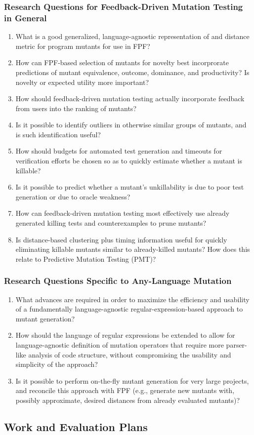 \subsubsection{Research Questions for Feedback-Driven Mutation Testing
in General}

\begin{enumerate}
\item What is a good generalized, language-agnostic representation
  of and distance metric for program mutants for use in FPF?
\item How can FPF-based selection of mutants for novelty best incorprorate
  predictions of mutant equivalence, outcome, dominance, and
  productivity?  Is novelty or expected utility more important?
\item How should feedback-driven mutation testing actually incorporate feedback from users into the 
  ranking of mutants? 
\item Is it possible to identify outliers in otherwise similar groups of
  mutants, and is such identification useful?
\item How should budgets for automated test generation and
  timeouts for verification efforts be chosen so as to quickly estimate whether a
  mutant is killable?
\item Is it possible to predict whether a mutant's unkillability is due to poor test 
  generation  or due to oracle weakness? 
\item How can feedback-driven mutation testing most effectively use already generated killing tests
  and counterexamples to prune mutants?
\item Is distance-based clustering plus timing information useful for quickly
  eliminating killable mutants similar to already-killed mutants?  How
  does this relate to Predictive Mutation Testing (PMT)?

\end{enumerate}

\subsubsection{Research Questions Specific to Any-Language Mutation}

\begin{enumerate}
\item What advances are required in order to maximize the efficiency and usability of a
  fundamentally language-agnostic regular-expression-based approach to
  mutant generation?
\item How should the language of regular expressions be extended to allow
  for language-agnostic definition of mutation operators that require
  more parser-like analysis of code structure, without compromising
  the usability and simplicity of the approach?
\item Is it possible to perform on-the-fly mutant generation for very
  large projects, and reconcile this approach with FPF (e.g., generate
  new mutants with, possibly approximate, desired distances from
  already evaluated mutants)?
\end{enumerate}

\subsection{Work and Evaluation Plans}
\label{sec:workplan}

